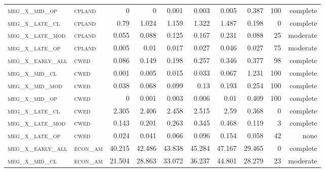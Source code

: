 \begin{landscape}
\begin{center}
\begin{footnotesize}
\begin{longtable}{llrrrrr|rrr}
\textsc{meg\_x\_mid\_op   } & \textsc{cpland    }    & 0        & 0        & 0.001    & 0.003    & 0.005     & 0.387         & 100           & complete             \\
\textsc{meg\_x\_late\_cl  } & \textsc{cpland    }    & 0.79     & 1.024    & 1.159    & 1.322    & 1.487     & 0.198         & 0             & complete            \\
\textsc{meg\_x\_late\_mod } & \textsc{cpland    }    & 0.055    & 0.088    & 0.125    & 0.167    & 0.231     & 0.088         & 25            & moderate             \\
\textsc{meg\_x\_late\_op  } & \textsc{cpland    }    & 0.005    & 0.01     & 0.017    & 0.027    & 0.046     & 0.027         & 75            & moderate              \\
\textsc{meg\_x\_early\_all} & \textsc{cwed      }    & 0.086    & 0.149    & 0.198    & 0.257    & 0.346     & 0.377         & 98            & complete              \\
\textsc{meg\_x\_mid\_cl   } & \textsc{cwed      }    & 0.001    & 0.005    & 0.015    & 0.033    & 0.067     & 1.231         & 100           & complete             \\
\textsc{meg\_x\_mid\_mod  } & \textsc{cwed      }    & 0.038    & 0.068    & 0.099    & 0.13     & 0.193     & 0.254         & 100           & complete             \\
\textsc{meg\_x\_mid\_op   } & \textsc{cwed      }    & 0        & 0.001    & 0.003    & 0.006    & 0.01      & 0.409         & 100           & complete             \\
\textsc{meg\_x\_late\_cl  } & \textsc{cwed      }    & 2.305    & 2.406    & 2.458    & 2.515    & 2.59      & 0.368         & 0             & complete            \\
\textsc{meg\_x\_late\_mod } & \textsc{cwed      }    & 0.143    & 0.201    & 0.263    & 0.345    & 0.468     & 0.119         & 3             & complete             \\
\textsc{meg\_x\_late\_op  } & \textsc{cwed      }    & 0.024    & 0.041    & 0.066    & 0.096    & 0.154     & 0.058         & 42            & none             \\
\textsc{meg\_x\_early\_all} & \textsc{econ\_am  }    & 40.215   & 42.486   & 43.838   & 45.284   & 47.167    & 29.465        & 0             & complete            \\
\textsc{meg\_x\_mid\_cl   } & \textsc{econ\_am  }    & 21.504   & 28.863   & 33.072   & 36.237   & 44.801    & 28.279        & 23            & moderate             \\

\end{longtable}
\end{footnotesize}
\end{center}
\end{landscape}
